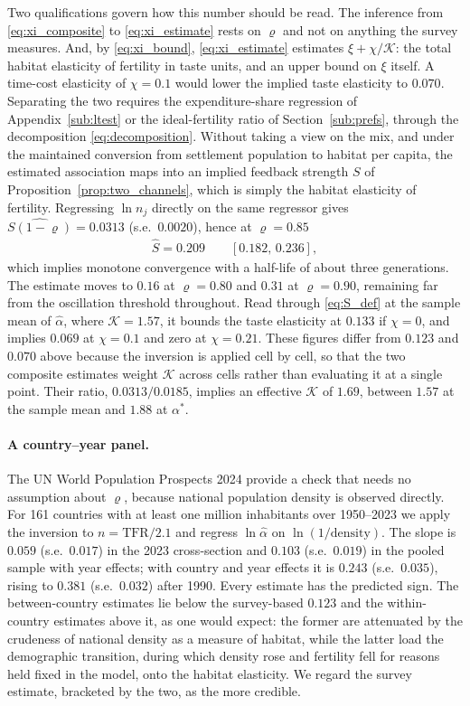 \documentclass[11pt]{article}
\begin{document}
Two qualifications govern how this number should be read. The inference from
\eqref{eq:xi_composite} to \eqref{eq:xi_estimate} rests on $\varrho$ and not on anything the survey
measures. And, by \eqref{eq:xi_bound}, \eqref{eq:xi_estimate} estimates $\xi+\chi/\mathcal{K}$: the total habitat
elasticity of fertility in taste units, and an upper bound on $\xi$ itself. A time-cost elasticity
of $\chi=0.1$ would lower the implied taste elasticity to $0.070$. Separating the two requires the
expenditure-share regression of Appendix~\ref{sub:ltest} or the ideal-fertility ratio of
Section~\ref{sub:prefs}, through the decomposition \eqref{eq:decomposition}. Without taking a view on the mix, and under the maintained conversion from settlement population
to habitat per capita, the estimated association maps into an implied feedback strength $S$ of
Proposition~\ref{prop:two_channels}, which is simply the habitat elasticity of fertility.
Regressing $\ln n_j$ directly on the same regressor gives $\widehat{S(1-\varrho)}=0.0313$
(s.e.\ $0.0020$), hence at $\varrho=0.85$
\begin{align}
\hat S=0.209\qquad[0.182,\,0.236],
\label{eq:S_estimate}
\end{align}
which implies monotone convergence with a half-life of about three generations. The estimate moves
to $0.16$ at $\varrho=0.80$ and $0.31$ at $\varrho=0.90$, remaining far from the oscillation threshold
throughout. Read through \eqref{eq:S_def} at the sample mean of $\hat\alpha$, where
$\mathcal{K}=1.57$, it bounds the taste elasticity at $0.133$ if $\chi=0$, and implies $0.069$ at
$\chi=0.1$ and zero at $\chi=0.21$. These figures differ from $0.123$ and $0.070$ above because the
inversion is applied cell by cell, so that the two composite estimates weight $\mathcal{K}$ across
cells rather than evaluating it at a single point. Their ratio, $0.0313/0.0185$, implies an effective
$\mathcal{K}$ of $1.69$, between $1.57$ at the sample mean and $1.88$ at $\alpha^\ast$.

\paragraph{A country--year panel.}
The UN World Population Prospects 2024 provide a check that needs no assumption about $\varrho$,
because national population density is observed directly. For 161 countries with at least one
million inhabitants over 1950--2023 we apply the inversion to $n=\text{TFR}/2.1$ and regress
$\ln\hat\alpha$ on $\ln(1/\text{density})$. The slope is $0.059$ (s.e.\ $0.017$) in the 2023
cross-section and $0.103$ (s.e.\ $0.019$) in the pooled sample with year effects; with country and
year effects it is $0.243$ (s.e.\ $0.035$), rising to $0.381$ (s.e.\ $0.032$) after 1990. Every
estimate has the predicted sign. The between-country estimates lie below the survey-based
$0.123$ and the within-country estimates above it, as one would expect: the former are attenuated
by the crudeness of national density as a measure of habitat, while the latter load the
demographic transition, during which density rose and fertility fell for reasons held fixed in the
model, onto the habitat elasticity. We regard the survey estimate, bracketed by the two, as the
more credible.
\end{document}

